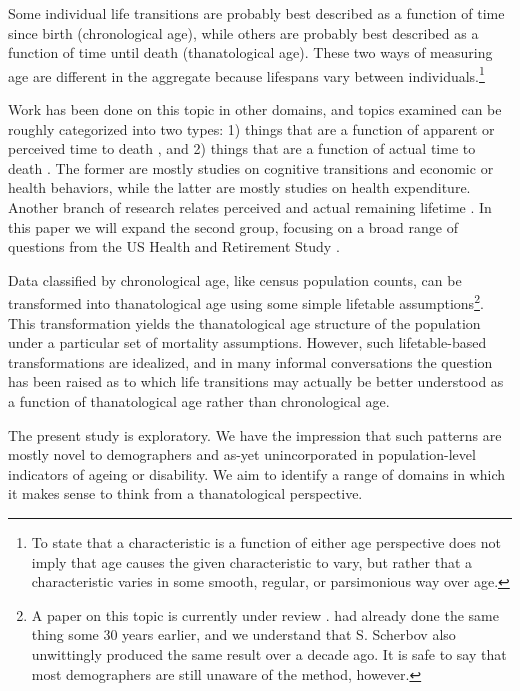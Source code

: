 \documentclass{article}
\begin{document}
Some individual life transitions are probably best described as a function of
time since birth (chronological age), while others are probably best described as a
function of time until death (thanatological age). These two ways of
measuring age are different in the aggregate because lifespans vary between
individuals.\footnote{To state that a characteristic is a function of either age
perspective does not imply that age causes the given
characteristic to vary, but rather that a characteristic varies in some
smooth, regular, or parsimonious way over age.} 

Work has been done on this topic in other domains, and
topics examined can be roughly categorized into two types: 1) things that are a
function of apparent or perceived time to death
\citep{hamermesh1985expectations,hurd1995evaluation,carstensen2006influence,gan2004subjective,biro2010subjective,salm2010subjective,van2010living,cocco2012longevity,payne2013life,balia2013survival},
and 2) things that are a function of actual time to death
\citep{miller2001increasing,seshamani2004longitudinal,werblow2007population}.
The former are mostly studies on cognitive transitions and economic or
health behaviors, while the latter are mostly studies on health expenditure.
Another branch of research relates perceived and actual remaining lifetime
\citep{perozek2008using,delavande2011differential,post2012longevity,kutlu2013individuals}.
In this paper we will expand the second group, focusing on a broad range of
questions from the US Health and Retirement Study \citep{HRS}.

Data classified by chronological age, like census population counts, can be
transformed into thanatological age using some simple lifetable
assumptions\footnote{A paper on this topic is currently under review \citep{riffe2014paaposter}. \citet{brouard1986structure,
brouard1989mouvements} had already done the same thing some 30 years earlier, and we understand that
S. Scherbov also unwittingly produced the same result over a decade ago. It is
safe to say that most demographers are still unaware of the method, however.}.
This transformation yields the thanatological age structure of the population
under a particular set of mortality assumptions.
However, such lifetable-based transformations are idealized, and in many informal
conversations the question has been raised as to which life transitions
may actually be better understood as a function of thanatological
age rather than chronological age.

The present study is exploratory. We have the impression
that such patterns are mostly novel to demographers and as-yet unincorporated in
population-level indicators of ageing or disability. We aim to identify a
range of domains in which it makes sense to think from a
thanatological perspective. 
\end{document}
